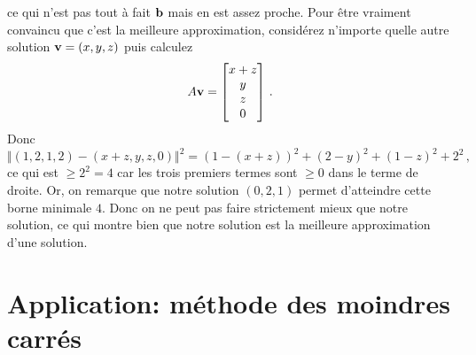 \begin{myprob}
\begin{mysol}
$$$$
ce qui n'est pas tout à fait $\mathbf{b}$ mais en est assez proche.
Pour être vraiment convaincu que c'est la meilleure approximation, considérez n'importe quelle autre solution $\mathbf{v}=(x,y,z)$ 
puis calculez 
$$
A\mathbf{v} = \left[ \begin{matrix} x+z\\ y\\ z\\ 0 \end{matrix} \right]\,.
$$
Donc 
$$
\Vert (1,2,1,2) - (x+z, y, z, 0) \Vert^2 = (1-(x+z))^2 + (2-y)^2 + (1-z)^2 + 2^2\,,
$$
ce qui est $\geq 2^2 = 4$ car les trois premiers termes sont $\geq0$ dans le terme de droite. Or, on remarque que notre solution $(0, 2, 1)$ permet d'atteindre cette borne minimale $4$. Donc on ne peut pas faire strictement mieux que notre solution, ce qui montre bien que notre solution est la meilleure approximation d'une solution.
\end{mysol}\end{myprob}




\section[Application : méthode des moindres carrés]{Application: méthode des moindres carrés}\label{leastsquares}


